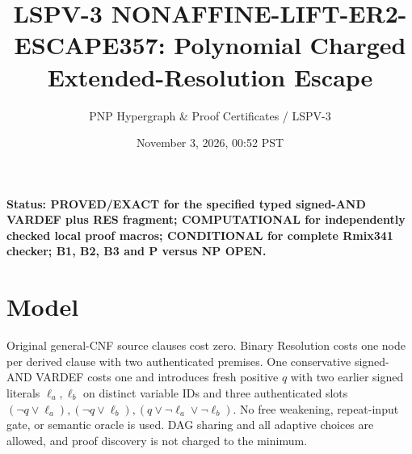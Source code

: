 \documentclass[11pt]{article}
\title{LSPV-3 NONAFFINE-LIFT-ER2-ESCAPE357: Polynomial Charged Extended-Resolution Escape}
\author{PNP Hypergraph \& Proof Certificates / LSPV-3}
\date{November 3, 2026, 00:52 PST}
\begin{document}
\maketitle
\noindent\textbf{Status: PROVED/EXACT for the specified typed signed-AND VARDEF plus RES fragment; COMPUTATIONAL for independently checked local proof macros; CONDITIONAL for complete Rmix341 checker; B1, B2, B3 and P versus NP OPEN.}

\section*{Model}
Original general-CNF source clauses cost zero. Binary Resolution costs one node per derived clause with two authenticated premises. One conservative signed-AND VARDEF costs one and introduces fresh positive $q$ with two earlier signed literals $\ell_a,\ell_b$ on distinct variable IDs and three authenticated slots $(\neg q\vee\ell_a),(\neg q\vee\ell_b),(q\vee\neg\ell_a\vee\neg\ell_b)$. No free weakening, repeat-input gate, or semantic oracle is used. DAG sharing and all adaptive choices are allowed, and proof discovery is not charged to the minimum.
\end{document}
